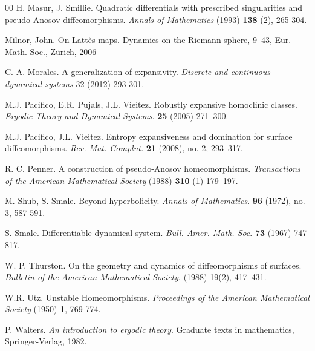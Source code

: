 \documentclass{amsart}
\theoremstyle{plain}
\theoremstyle{definition}
\begin{document}
\begin{thebibliography}{00}
 H. Masur, J. Smillie. Quadratic differentials with prescribed singularities and pseudo-Anosov diffeomorphisms. \emph{Annals of Mathematics} (1993) \textbf{138} (2), 265-304.


 Milnor, John. On Latt\`es maps. Dynamics on the Riemann sphere, 9--43, Eur. Math. Soc., Zürich, 2006

 C. A. Morales.
A generalization of expansivity. \emph{Discrete and continuous dynamical systems} 32 (2012) 293-301.

 M.J. Pacifico, E.R. Pujals, J.L. Vieitez. Robustly expansive homoclinic classes. \emph{Ergodic Theory and Dynamical Systems}. \textbf{25} (2005) 271–300.

 M.J. Pacifico, J.L. Vieitez. Entropy expansiveness and domination for surface diffeomorphisms. \emph{Rev. Mat. Complut.} \textbf{21} (2008), no. 2, 293–317.

 R. C. Penner. A construction of pseudo-Anosov homeomorphisms. \emph{Transactions of the American Mathematical Society} (1988) \textbf{310} (1) 179–197.

 M. Shub, S. Smale. Beyond hyperbolicity. \emph{Annals of Mathematics}. \textbf{96} (1972), no. 3, 587-591.

 S. Smale. Differentiable dynamical system. \emph{Bull. Amer. Math. Soc}. \textbf{73} (1967) 747-817.

 W. P. Thurston. On the geometry and dynamics of diffeomorphisms of surfaces. \emph{Bulletin of the American Mathematical Society}. (1988) 19(2), 417–431.

 W.R. Utz. Unstable Homeomorphisms. \emph{Proceedings of the American Mathematical Society} (1950) \textbf{1}, 769-774. 

 P. Walters. \emph{An introduction to ergodic theory}. Graduate texts in mathematics, Springer-Verlag, 1982.











\end{thebibliography}

\vspace{1.0cm}
\end{document}
